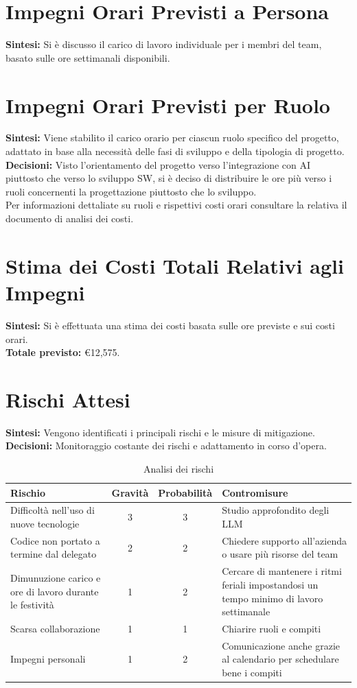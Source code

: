\documentclass{article}
\begin{document}
\section{Impegni Orari Previsti a Persona}
\textbf{Sintesi:} Si è discusso il carico di lavoro individuale per i membri del team, basato sulle ore settimanali disponibili.

\section{Impegni Orari Previsti per Ruolo}
\textbf{Sintesi:} Viene stabilito il carico orario per ciascun ruolo specifico del progetto, adattato in base alla necessità delle fasi di sviluppo e della tipologia di progetto. \\
\textbf{Decisioni:} Visto l'orientamento del progetto verso l'integrazione con AI piuttosto che verso lo sviluppo SW, si è deciso di distribuire le ore più verso i ruoli concernenti la progettazione piuttosto che lo sviluppo.\\Per informazioni dettaliate su ruoli e rispettivi costi orari consultare la relativa il documento di analisi dei costi.

\section{Stima dei Costi Totali Relativi agli Impegni}
\textbf{Sintesi:} Si è effettuata una stima dei costi basata sulle ore previste e sui costi orari. \\
\textbf{Totale previsto:} €12,575. 

\section{Rischi Attesi}
\textbf{Sintesi:} Vengono identificati i principali rischi e le misure di mitigazione.\\
\textbf{Decisioni:} Monitoraggio costante dei rischi e adattamento in corso d’opera.

\begin{table}[h]
\centering
\begin{tabularx}{\textwidth}{|X|c|c|X|}
    \hline
    \textbf{Rischio} & \textbf{Gravità} & \textbf{Probabilità}& \textbf{Contromisure}\\
    \hline
    Difficoltà nell'uso di nuove tecnologie & 3& 3 & Studio approfondito degli LLM \\ 
    \hline
    Codice non portato a termine dal delegato & 2 & 2 & Chiedere supporto all'azienda o usare più risorse del team\\ 
    \hline
    Dimunuzione carico e ore di lavoro durante le festività & 1 & 2 & Cercare di mantenere i ritmi feriali impostandosi un tempo minimo di lavoro settimanale\\ 
    \hline 
    Scarsa collaborazione & 1& 1 & Chiarire ruoli e compiti \\ 
    \hline
    Impegni personali & 1 & 2 & Comunicazione anche grazie al calendario per schedulare bene i compiti\\ 
    \hline 
\end{tabularx}
\caption{Analisi dei rischi}
\end{table}
\end{document}
